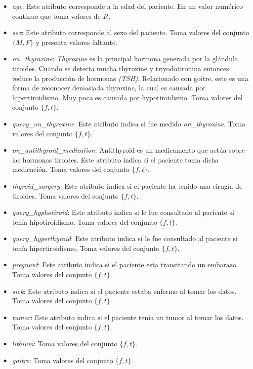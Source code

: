 \documentclass[osajnl,twocolumn,showpacs,superscriptaddress,10pt,floatfix]{revtex4-1} %
\begin{document}
\begin{itemize}
    \item \textit{age}: Este atributo corresponde a la edad del paciente. En un valor numérico continuo que toma valores de $R$.
    \item \textit{sex}: Este atributo corresponde al sexo del paciente. Toma valores del conjunto $\{M, F\}$ y presenta valores faltante.
    \item \textit{on\_thyroxine}:  \textit{Thyroxine} es la principal hormona generada por la glándula tiroides. Cuando se detecta mucha thyroxine y triyodotironina entonces reduce la producción de hormonas \textit{(TSH)}. Relacionado con goitre, este es una forma de reconocer demasiada thyroxine, la cual es causada por hipertiroidismo. Muy poca es causada por hypotiroidismo. Toma valores del conjunto $\{f, t\}$.
    \item \textit{query\_on\_thyroxine}: Este atributo indica si fue medido \textit{on\_thyroxine}. Toma valores del conjunto $\{f, t\}$.
    \item \textit{on\_antithyroid\_medication}: Antithyroid es un medicamento que actúa sobre las hormonas tiroides. Este atributo indica si el paciente toma dicha medicación. Toma valores del conjunto $\{f, t\}$.
    \item \textit{thyroid\_surgery}: Este atributo indica si el paciente ha tenido una cirugía de tiroides. Toma valores del conjunto $\{f, t\}$.
    \item \textit{query\_hyphotiroid}: Este atributo indica si le fue consultado al paciente si tenía hipotiroidismo. Toma valores del conjunto $\{f, t\}$.
    \item \textit{query\_hyperthyroid}: Este atributo indica si le fue consultado al paciente si tenía hipertiroidismo. Toma valores del conjunto $\{f, t\}$.
    \item \textit{pregnant}: Este atributo indica si el paciente esta transitando un embarazo. Toma valores del conjunto $\{f, t\}$.
    \item \textit{sick}: Este atributo indica si el paciente estaba enfermo al tomar los datos. Toma valores del conjunto $\{f, t\}$.
    \item \textit{tumor}: Este atributo indica si el paciente tenía un tumor al tomar los datos. Toma valores del conjunto $\{f, t\}$.
    \item \textit{lithium}: Toma valores del conjunto $\{f, t\}$.
    \item \textit{goitre}: Toma valores del conjunto $\{f, t\}$.

\end{itemize}
\end{document}
